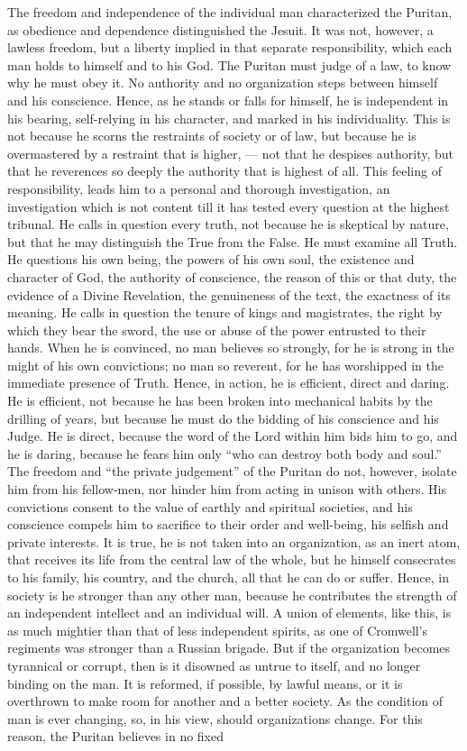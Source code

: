 \documentclass[]{book}
\begin{document}
The freedom and independence of the individual man characterized the Puritan, as obedience and dependence distinguished the Jesuit. It was not, however, a lawless freedom, but a liberty implied in that separate responsibility, which each man holds to himself and to his God. The Puritan must judge of a law, to know why he must obey it. No authority and no organization steps between himself and his conscience. Hence, as he stands or falls for himself, he is independent in his bearing, self-relying in his character, and marked in his individuality. This is not because he scorns the restraints of society or of law, but because he is overmastered by a restraint that is higher, --- not that he despises authority, but that he reverences so deeply the authority that is highest of all. This feeling of responsibility, leads him to a personal and thorough investigation, an investigation which is not content till it has tested every question at the highest tribunal. He calls in question every truth, not because he is skeptical by nature, but that he may distinguish the True from the False. He must examine all Truth. He questions his own being, the powers of his own soul, the existence and character of God, the authority of conscience, the reason of this or that duty, the evidence of a Divine Revelation, the genuineness of the text, the exactness of its meaning. He calls in question the tenure of kings and magistrates, the right by which they bear the sword, the use or abuse of the power entrusted to their hands. When he is convinced, no man believes so strongly, for he is strong in the might of his own convictions; no man so reverent, for he has worshipped in the immediate presence of Truth. Hence, in action, he is efficient, direct and daring. He is efficient, not because he has been broken into mechanical habits by the drilling of years, but because he must do the bidding of his conscience and his Judge. He is direct, because the word of the Lord within him bids him to go, and he is daring, because he fears him only ``who can destroy both body and soul.'' The freedom and ``the private judgement'' of the Puritan do not, however, isolate him from his fellow-men, nor hinder him from acting in unison with others. His convictions consent to the value of earthly and spiritual societies, and his conscience compels him to sacrifice to their order and well-being, his selfish and private interests. It is true, he is not taken into an organization, as an inert atom, that receives its life from the central law of the whole, but he himself consecrates to his family, his country, and the church, all that he can do or suffer. Hence, in society is he stronger than any other man, because he contributes the strength of an independent intellect and an individual will. A union of elements, like this, is as much mightier than that of less independent spirits, as one of Cromwell's regiments was stronger than a Russian brigade. But if the organization becomes tyrannical or corrupt, then is it disowned as untrue to itself, and no longer binding on the man. It is reformed, if possible, by lawful means, or it is overthrown to make room for another and a better society. As the condition of man is ever changing, so, in his view, should organizations change. For this reason, the Puritan believes in no fixed 
\end{document}
